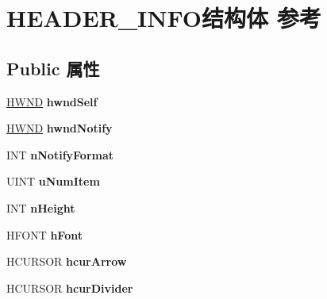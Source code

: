 \hypertarget{struct_h_e_a_d_e_r___i_n_f_o}{}\section{H\+E\+A\+D\+E\+R\+\_\+\+I\+N\+F\+O结构体 参考}
\label{struct_h_e_a_d_e_r___i_n_f_o}
\subsection*{Public 属性}
\begin{DoxyCompactItemize}
\item 
\mbox{\label{struct_h_e_a_d_e_r___i_n_f_o_af3ccba495ba280606a657588d8ea37ae}} 
\hyperlink{interfacevoid}{H\+W\+ND} {\bfseries hwnd\+Self}
\item 
\mbox{\label{struct_h_e_a_d_e_r___i_n_f_o_afb2f4ae243ed1c2706b734b2e6e7d73e}} 
\hyperlink{interfacevoid}{H\+W\+ND} {\bfseries hwnd\+Notify}
\item 
\mbox{\label{struct_h_e_a_d_e_r___i_n_f_o_afb92beea007d9366d5f116510091eb7b}} 
I\+NT {\bfseries n\+Notify\+Format}
\item 
\mbox{\label{struct_h_e_a_d_e_r___i_n_f_o_a42bc92fc7a72ac82e48fffa4dc5f2cdc}} 
U\+I\+NT {\bfseries u\+Num\+Item}
\item 
\mbox{\label{struct_h_e_a_d_e_r___i_n_f_o_a591684e7bd2e06a65062e1c76924a79c}} 
I\+NT {\bfseries n\+Height}
\item 
\mbox{\label{struct_h_e_a_d_e_r___i_n_f_o_a7c2c0aa030068025f562eda1bf5992ed}} 
H\+F\+O\+NT {\bfseries h\+Font}
\item 
\mbox{\label{struct_h_e_a_d_e_r___i_n_f_o_afc130bc974d29efe8a6bd6a8bcd738f5}} 
H\+C\+U\+R\+S\+OR {\bfseries hcur\+Arrow}
\item 
\mbox{\label{struct_h_e_a_d_e_r___i_n_f_o_a6e732f1cf6c43401e10a709387fb1f84}} 
H\+C\+U\+R\+S\+OR {\bfseries hcur\+Divider}
\item 

\end{DoxyCompactItemize}
